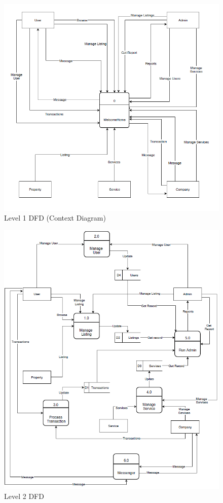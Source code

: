 \documentclass[12pt,a4paper]{report}
\begin{document}
\begin{itemize}
\begin{figure}[H]
\centering
\includegraphics[scale=1.0]{dfd1.png}
\caption{Level 1 DFD (Context Diagram)}
\label{Figure:dfd1}
\end{figure}

\begin{figure}[H]
\centering
\includegraphics[scale=1.0]{dfd2.png}
\caption{Level 2 DFD}
\label{Figure:dfd2}
\end{figure}


\end{itemize}
\end{document}
